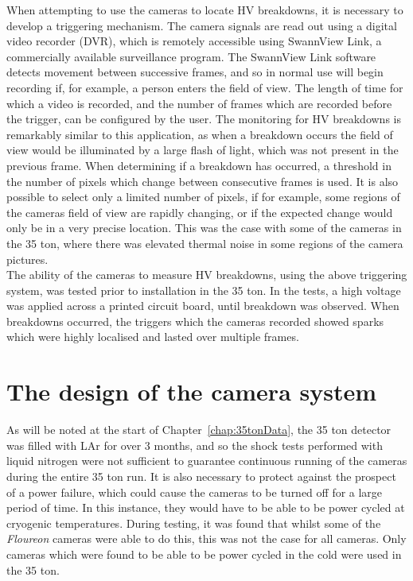 When attempting to use the cameras to locate HV breakdowns, it is necessary to develop a triggering mechanism. The camera signals are read out using a digital video recorder (DVR), which is remotely accessible using SwannView Link, a commercially available surveillance program. The SwannView Link software detects movement between successive frames, and so in normal use will begin recording if, for example, a person enters the field of view. The length of time for which a video is recorded, and the number of frames which are recorded before the trigger, can be configured by the user. The monitoring for HV breakdowns is remarkably similar to this application, as when a breakdown occurs the field of view would be illuminated by a large flash of light, which was not present in the previous frame. When determining if a breakdown has occurred, a threshold in the number of pixels which change between consecutive frames is used. It is also possible to select only a limited number of pixels, if for example, some regions of the cameras field of view are rapidly changing, or if the expected change would only be in a very precise location. This was the case with some of the cameras in the 35 ton, where there was elevated thermal noise in some regions of the camera pictures. \\

The ability of the cameras to measure HV breakdowns, using the above triggering system, was tested prior to installation in the 35 ton. In the tests, a high voltage was applied across a printed circuit board, until breakdown was observed. When breakdowns occurred, the triggers which the cameras recorded showed sparks which were highly localised and lasted over multiple frames. \\

\section{The design of the camera system} \label{sec:CamDesign} %

As will be noted at the start of Chapter~\ref{chap:35tonData}, the 35 ton detector was filled with LAr for over 3 months, and so the shock tests performed with liquid nitrogen were not sufficient to guarantee continuous running of the cameras during the entire 35 ton run. It is also necessary to protect against the prospect of a power failure, which could cause the cameras to be turned off for a large period of time. In this instance, they would have to be able to be power cycled at cryogenic temperatures. During testing, it was found that whilst some of the \emph{Floureon} cameras were able to do this, this was not the case for all cameras. Only cameras which were found to be able to be power cycled in the cold were used in the 35 ton. \\

